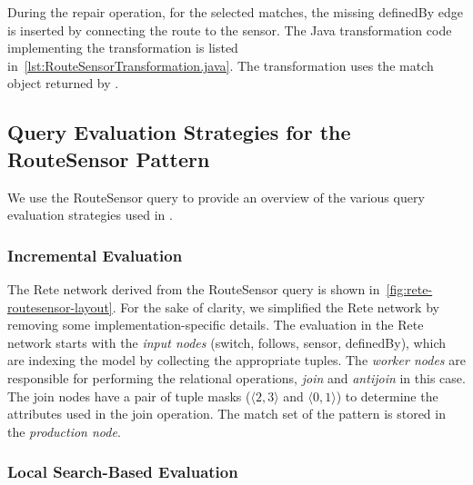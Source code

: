 \documentclass[submission,copyright,creativecommons]{eptcs}
\begin{document}


During the \textsf{repair} operation, for the selected matches, the missing \textsf{definedBy} edge is inserted by connecting the
route to the sensor. The Java transformation code implementing the transformation is listed in~\autoref{lst:RouteSensorTransformation.java}. The transformation uses the match object returned by \eiq.



\subsection{Query Evaluation Strategies for the \textsf{RouteSensor} Pattern}

We use the \textsf{RouteSensor} query to provide an overview of the various query evaluation strategies used in \eiq.

\subsubsection{Incremental Evaluation}

The Rete network derived from the \textsf{RouteSensor} query is shown in~\autoref{fig:rete-routesensor-layout}. For the sake of clarity, we simplified the Rete network by removing some implementation-specific details. The evaluation in the Rete network starts with the \emph{input nodes} (\textsf{switch}, \textsf{follows}, \textsf{sensor}, \textsf{definedBy}), which are indexing the model by collecting the appropriate tuples. The \emph{worker nodes} are responsible for performing the relational operations, \emph{join} and \emph{antijoin} in this case. The join nodes have a pair of tuple masks (\eg $\langle 2, 3 \rangle$ and $\langle 0, 1 \rangle$) to determine the attributes used in the join operation. The match set of the pattern is stored in the \emph{production node}.

\subsubsection{Local Search-Based Evaluation}
\end{document}
